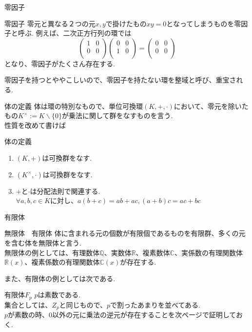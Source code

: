 \documentclass[dvipdfmx,11pt,notheorems]{beamer}
\begin{document}
\begin{frame}{零因子}
  \begin{block}{零因子}
    零元と異なる２つの元$x,y$で掛けたもの$xy=0$となってしまうものを\alert{零因子}と呼ぶ. 例えば、二次正方行列の環では
    \begin{equation}
      \begin{pmatrix}
        1 & 0 \\
        0 & 0 \\
      \end{pmatrix}
      \begin{pmatrix}
        0 & 0 \\
        1 & 0 \\
      \end{pmatrix}
      =
      \begin{pmatrix}
        0 & 0 \\
        0 & 0 \\
      \end{pmatrix}
    \end{equation}
    となり、零因子がたくさん存在する.
  \end{block}
  零因子を持つとややこしいので、零因子を持たない環を\alert{整域}と呼び、重宝される.
\end{frame}
\begin{frame}{体の定義}
  \alert{体}は環の特別なもので、単位可換環$(K,+,\cdot)$において、零元を除いたもの$K^\times := K\backslash \{0\}$が乗法に関して群をなすものを言う. \\
  性質を改めて書けば
  \begin{block}{体の定義}
    \begin{enumerate}
      \item $(K,+)$は可換群をなす.
      \item $(K^\times,\cdot)$は可換群をなす.
      \item $+$と$\cdot$は分配法則で関連する. \\
      $\forall a,b,c \in K$に対し、$a(b+c)=ab + ac,    (a+b)c=ac+bc$
    \end{enumerate}
  \end{block}
\end{frame}

\begin{frame}{有限体}
  \begin{block}{無限体　有限体}
    体に含まれる元の個数が有限個であるものを\alert{有限群}、多くの元を含む体を\alert{無限体}と言う. \\
    無限体の例としては、有理数体$\mathbb{Q}$、実数体$\mathbb{R}$、複素数体$\mathbb{C}$、実係数の有理関数体$\mathbb{R}(x)$、複素係数の有理関数体$\mathbb{C}(x)$が存在する.
  \end{block}
  また、有限体の例としては次である.
  \begin{exampleblock}{有限体$F_p$}
    $p$は素数である.\\
    集合としては、$Z_p$と同じもので、$p$で割ったあまりを並べてある.\\
    $p$が素数の時、$0$以外の元に乗法の逆元が存在することを次ページで証明しておく.
  \end{exampleblock}
\end{frame}
\end{document}
